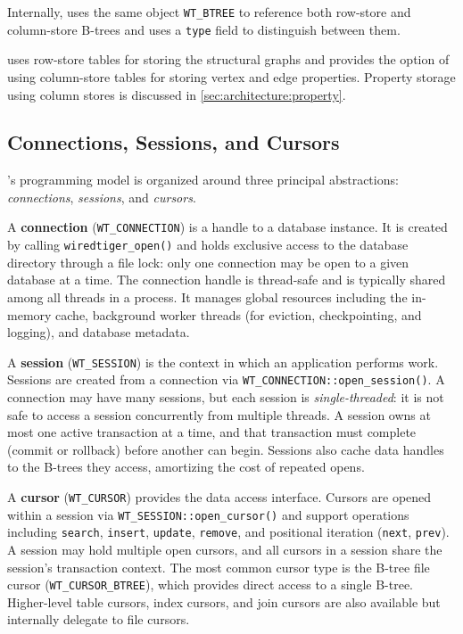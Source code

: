 Internally, \wt{} uses the same object \texttt{WT\_BTREE} to reference both row-store and column-store B-trees and uses a \texttt{type} field to distinguish between them.

\project{} uses row-store tables for storing the structural graphs and provides the option of using column-store tables for storing
vertex and edge properties.
Property storage using column stores is discussed in \autoref{sec:architecture:property}.

\subsection{Connections, Sessions, and Cursors}
\label{sec:wt-conn-sess-cur}

\wt{}'s programming model is organized around three principal
abstractions: \emph{connections}, \emph{sessions}, and \emph{cursors}.

A \textbf{connection} (\texttt{WT\_CONNECTION}) is a handle to a \wt{}
database instance.
It is created by calling \texttt{wiredtiger\_open()} and holds exclusive access to the database directory through a file lock: only one connection may be open to a given database at a time.
The connection handle is thread-safe and is typically shared among all threads in a process.
It manages global resources including the in-memory cache, background worker
threads (for eviction, checkpointing, and logging), and database metadata.

A \textbf{session} (\texttt{WT\_SESSION}) is the context in which an
application performs work.
Sessions are created from a connection via \texttt{WT\_CONNECTION::open\_session()}.
A connection may have many sessions, but each session is \emph{single-threaded}: it is not safe to access a session concurrently from multiple threads.
A session owns at most one active transaction at a time, and that transaction must complete (commit or rollback) before another can begin.
Sessions also cache data handles to the B-trees they access, amortizing the cost of repeated opens.

A \textbf{cursor} (\texttt{WT\_CURSOR}) provides the data access interface.
Cursors are opened within a session via \texttt{WT\_SESSION::open\_cursor()}
and support operations including \texttt{search}, \texttt{insert},
\texttt{update}, \texttt{remove}, and positional iteration (\texttt{next},
\texttt{prev}).
A session may hold multiple open cursors, and all cursors in a session share the session's transaction context.
The most common cursor type is the B-tree file cursor (\texttt{WT\_CURSOR\_BTREE}), which provides direct access to a single B-tree.
Higher-level table cursors, index cursors, and join cursors are also available but internally delegate to file cursors.

